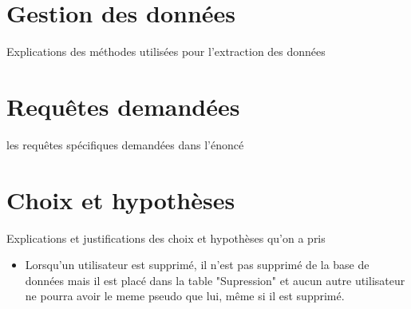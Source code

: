 \documentclass[a4paper,11pt]{article}
\begin{document}
\section{Gestion des données}

Explications des méthodes utilisées pour l'extraction des données

\section{Requêtes demandées}

les requêtes spécifiques demandées dans l'énoncé

\section{Choix et hypothèses}

Explications et justifications des choix et hypothèses qu'on a pris

\begin{itemize}
    \item Lorsqu'un utilisateur est supprimé, il n'est pas supprimé de la base de données mais il est placé dans la table "Supression" et aucun autre utilisateur ne pourra avoir le meme pseudo que lui, même si il est supprimé.
    
\end{itemize}
\end{document}
